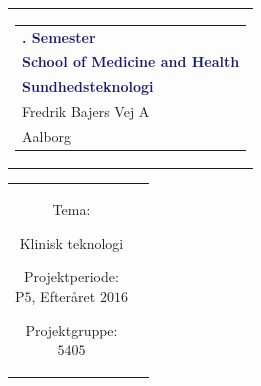 % 
\thispagestyle{empty}
\begin{nopagebreak}
	{\samepage 
		
		\begin{tabular}{r}
			\parbox{\textwidth}{  
				\hfill \hspace{2cm} \parbox{8cm}{\begin{tabular}{l} %
						{\small \textbf{\textcolor{MidnightBlue}{{$5$. Semester}}}}\\
						{\small \textbf{\textcolor{MidnightBlue}{School of Medicine and Health}}}\\
						{\small \textbf{\textcolor{MidnightBlue}{Sundhedsteknologi}}}\\
						{\small \textcolor{NavyBlue}{Fredrik Bajers Vej $7$A}} \\
						{\small \textcolor{NavyBlue}{$9220$ Aalborg}} \\
			\end{tabular}}}
		\end{tabular}
		
		\begin{tabular}{cc}
			\parbox{7cm}{
				\begin{description}

%

\item {Tema:} 

\small{
Klinisk teknologi
}

\end{description}

\parbox{8cm}{

\begin{description}
\item {Projektperiode:}\\
   P$5$, Efteråret $2016$\\
   
\item {Projektgruppe:}\\
  $5405$\\
  

\end{description}}}
\end{tabular}}
\end{nopagebreak}
